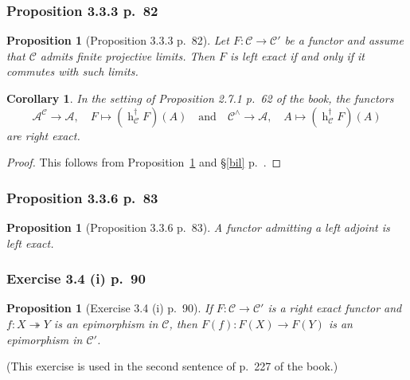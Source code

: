 \documentclass[12pt]{article}
\newtheorem{prop}[thm]{Proposition}
\newtheorem{cor}[thm]{Corollary}
\theoremstyle{remark}
\theoremstyle{definition}
\newcommand{\oo}{\operatorname}
\newcommand{\A}{\mathcal A}
\newcommand{\C}{\mathcal C}
\newcommand{\epi}{\twoheadrightarrow}
\begin{document}
\subsubsection{Proposition 3.3.3 p.~82}

\begin{prop}[Proposition 3.3.3 p.~82]\label{333}
Let $F:\C\to\C'$ be a functor and assume that $\C$ admits finite projective limits. Then $F$ is left exact if and only if it commutes with such limits.
\end{prop}

\begin{cor}\label{bre}
In the setting of Proposition 2.7.1 p.~62 of the book, the functors
$$
\A^\C\to\A,\quad F\mapsto(\oo h_\C^\dagger F)(A)\quad\text{and}\quad
\C^\wedge\to\A,\quad A\mapsto(\oo h_\C^\dagger F)(A)
$$ 
are right exact. 
\end{cor}

\begin{proof}
This follows from Proposition~\ref{333} and \S\ref{bil} p.~\pageref{bil}.
\end{proof}

\subsubsection{Proposition 3.3.6 p.~83}

\begin{prop}[Proposition 3.3.6 p.~83]\label{336}
A functor admitting a left adjoint is left exact.
\end{prop}

\subsubsection{Exercise 3.4 (i) p.~90}

\begin{prop}[Exercise 3.4 (i) p.~90]\label{34i}
If $F:\C\to\C'$ is a right exact functor and $f:X\epi Y$ is an epimorphism in $\C$, then $F(f):F(X)\to F(Y)$ is an epimorphism in $\C'$.
\end{prop}

(This exercise is used in the second sentence of p.~227 of the book.)
\end{document}
